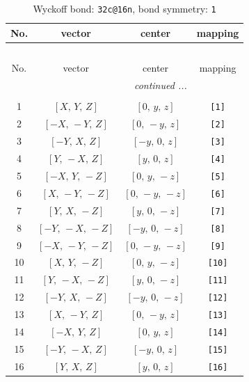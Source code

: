 \documentclass[fleqn,8pt]{jsarticle}
\begin{document}
\begin{longtable}{cccc}
\caption{Wyckoff bond: {\tt 32c@16n}, bond symmetry: {\tt 1}}
 \\
 \hline \hline
No. & vector & center & mapping \\ \hline \endfirsthead

\multicolumn{3}{l}{\tablename\ \thetable{}} \\
 \hline \hline
No. & vector & center & mapping \\ \hline \endhead

 \hline \hline
\multicolumn{3}{r}{\footnotesize\it continued ...} \\ \endfoot

 \hline \hline
\multicolumn{3}{r}{} \\ \endlastfoot

1 & $\left[ X,\, Y,\, Z \right]$ & $\left[ 0,\, y,\, z \right]$ & {\tt [1]} \\ \hline
2 & $\left[ - X,\, - Y,\, Z \right]$ & $\left[ 0,\, - y,\, z \right]$ & {\tt [2]} \\ \hline
3 & $\left[ - Y,\, X,\, Z \right]$ & $\left[ - y,\, 0,\, z \right]$ & {\tt [3]} \\ \hline
4 & $\left[ Y,\, - X,\, Z \right]$ & $\left[ y,\, 0,\, z \right]$ & {\tt [4]} \\ \hline
5 & $\left[ - X,\, Y,\, - Z \right]$ & $\left[ 0,\, y,\, - z \right]$ & {\tt [5]} \\ \hline
6 & $\left[ X,\, - Y,\, - Z \right]$ & $\left[ 0,\, - y,\, - z \right]$ & {\tt [6]} \\ \hline
7 & $\left[ Y,\, X,\, - Z \right]$ & $\left[ y,\, 0,\, - z \right]$ & {\tt [7]} \\ \hline
8 & $\left[ - Y,\, - X,\, - Z \right]$ & $\left[ - y,\, 0,\, - z \right]$ & {\tt [8]} \\ \hline
9 & $\left[ - X,\, - Y,\, - Z \right]$ & $\left[ 0,\, - y,\, - z \right]$ & {\tt [9]} \\ \hline
10 & $\left[ X,\, Y,\, - Z \right]$ & $\left[ 0,\, y,\, - z \right]$ & {\tt [10]} \\ \hline
11 & $\left[ Y,\, - X,\, - Z \right]$ & $\left[ y,\, 0,\, - z \right]$ & {\tt [11]} \\ \hline
12 & $\left[ - Y,\, X,\, - Z \right]$ & $\left[ - y,\, 0,\, - z \right]$ & {\tt [12]} \\ \hline
13 & $\left[ X,\, - Y,\, Z \right]$ & $\left[ 0,\, - y,\, z \right]$ & {\tt [13]} \\ \hline
14 & $\left[ - X,\, Y,\, Z \right]$ & $\left[ 0,\, y,\, z \right]$ & {\tt [14]} \\ \hline
15 & $\left[ - Y,\, - X,\, Z \right]$ & $\left[ - y,\, 0,\, z \right]$ & {\tt [15]} \\ \hline
16 & $\left[ Y,\, X,\, Z \right]$ & $\left[ y,\, 0,\, z \right]$ & {\tt [16]} \\
\end{longtable}
\end{document}
